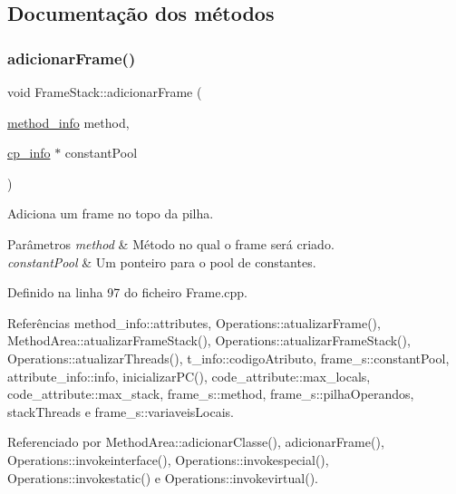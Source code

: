 \subsection{Documentação dos métodos}
\mbox{\label{classFrameStack_aee31df6406a899bbf581eea9fc5545e6}} 
\subsubsection{\texorpdfstring{adicionar\+Frame()}{adicionarFrame()}\hspace{0.1cm}{\footnotesize\ttfamily [1/2]}}
{\footnotesize\ttfamily void Frame\+Stack\+::adicionar\+Frame (\begin{DoxyParamCaption}\item[{\hyperlink{structmethod__info}{method\+\_\+info}}]{method,  }\item[{\hyperlink{structcp__info}{cp\+\_\+info} $\ast$}]{constant\+Pool }\end{DoxyParamCaption})}



Adiciona um frame no topo da pilha. 


\begin{DoxyParams}{Parâmetros}
{\em method} & Método no qual o frame será criado. \\
\hline
{\em constant\+Pool} & Um ponteiro para o pool de constantes. \\
\hline
\end{DoxyParams}


Definido na linha 97 do ficheiro Frame.\+cpp.



Referências method\+\_\+info\+::attributes, Operations\+::atualizar\+Frame(), Method\+Area\+::atualizar\+Frame\+Stack(), Operations\+::atualizar\+Frame\+Stack(), Operations\+::atualizar\+Threads(), t\+\_\+info\+::codigo\+Atributo, frame\+\_\+s\+::constant\+Pool, attribute\+\_\+info\+::info, inicializar\+P\+C(), code\+\_\+attribute\+::max\+\_\+locals, code\+\_\+attribute\+::max\+\_\+stack, frame\+\_\+s\+::method, frame\+\_\+s\+::pilha\+Operandos, stack\+Threads e frame\+\_\+s\+::variaveis\+Locais.



Referenciado por Method\+Area\+::adicionar\+Classe(), adicionar\+Frame(), Operations\+::invokeinterface(), Operations\+::invokespecial(), Operations\+::invokestatic() e Operations\+::invokevirtual().

